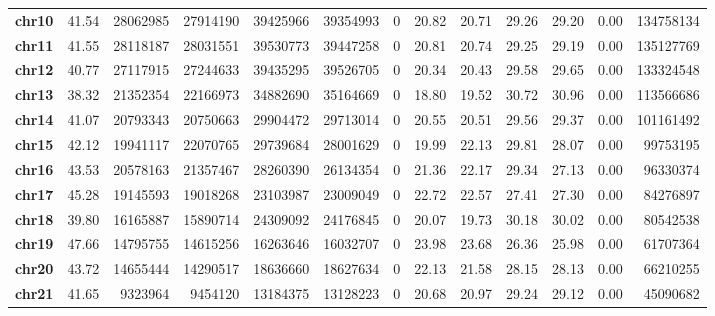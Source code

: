 \documentclass[a4paper,10pt]{article}
\begin{document}
\begin{table}[h]
\begin{tabularx}{\textwidth}{c|rrrrrrrrrrrr}
\textbf{chr10} & 41.54         & 28062985   & 27914190   & 39425966   & 39354993   & 0          & 20.82        & 20.71        & 29.26        & 29.20        & 0.00         & 134758134         \\
\textbf{chr11} & 41.55         & 28118187   & 28031551   & 39530773   & 39447258   & 0          & 20.81        & 20.74        & 29.25        & 29.19        & 0.00         & 135127769         \\
\textbf{chr12} & 40.77         & 27117915   & 27244633   & 39435295   & 39526705   & 0          & 20.34        & 20.43        & 29.58        & 29.65        & 0.00         & 133324548         \\
\textbf{chr13} & 38.32         & 21352354   & 22166973   & 34882690   & 35164669   & 0          & 18.80        & 19.52        & 30.72        & 30.96        & 0.00         & 113566686         \\
\textbf{chr14} & 41.07         & 20793343   & 20750663   & 29904472   & 29713014   & 0          & 20.55        & 20.51        & 29.56        & 29.37        & 0.00         & 101161492         \\
\textbf{chr15} & 42.12         & 19941117   & 22070765   & 29739684   & 28001629   & 0          & 19.99        & 22.13        & 29.81        & 28.07        & 0.00         & 99753195          \\
\textbf{chr16} & 43.53         & 20578163   & 21357467   & 28260390   & 26134354   & 0          & 21.36        & 22.17        & 29.34        & 27.13        & 0.00         & 96330374          \\
\textbf{chr17} & 45.28         & 19145593   & 19018268   & 23103987   & 23009049   & 0          & 22.72        & 22.57        & 27.41        & 27.30        & 0.00         & 84276897          \\
\textbf{chr18} & 39.80         & 16165887   & 15890714   & 24309092   & 24176845   & 0          & 20.07        & 19.73        & 30.18        & 30.02        & 0.00         & 80542538          \\
\textbf{chr19} & 47.66         & 14795755   & 14615256   & 16263646   & 16032707   & 0          & 23.98        & 23.68        & 26.36        & 25.98        & 0.00         & 61707364          \\
\textbf{chr20} & 43.72         & 14655444   & 14290517   & 18636660   & 18627634   & 0          & 22.13        & 21.58        & 28.15        & 28.13        & 0.00         & 66210255          \\
\textbf{chr21} & 41.65         & 9323964    & 9454120    & 13184375   & 13128223   & 0          & 20.68        & 20.97        & 29.24        & 29.12        & 0.00         & 45090682          \\

\end{tabularx}
\end{table}
\end{document}
